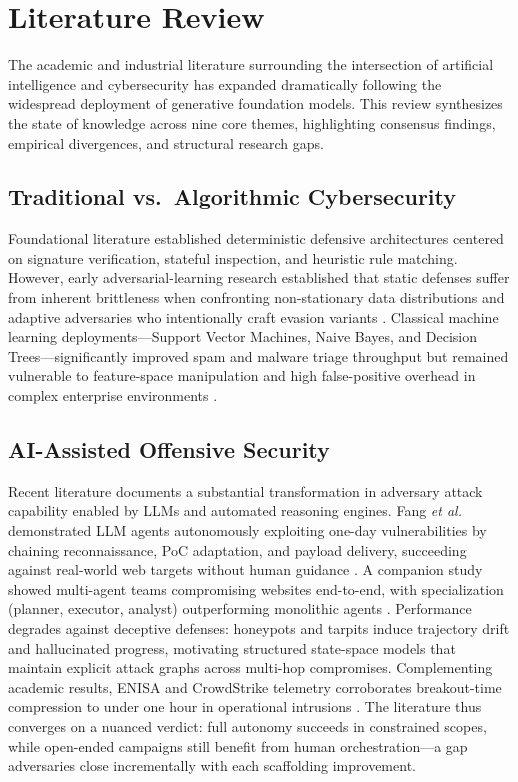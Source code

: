 \documentclass[conference,10pt,twocolumn,a4paper]{IEEEtran}
\begin{document}
\section{Literature Review}
\label{sec:literature}
The academic and industrial literature surrounding the intersection of artificial intelligence and cybersecurity has expanded dramatically following the widespread deployment of generative foundation models. This review synthesizes the state of knowledge across nine core themes, highlighting consensus findings, empirical divergences, and structural research gaps.

\subsection{Traditional vs.\ Algorithmic Cybersecurity}
Foundational literature established deterministic defensive architectures centered on signature verification, stateful inspection, and heuristic rule matching. However, early adversarial-learning research established that static defenses suffer from inherent brittleness when confronting non-stationary data distributions and adaptive adversaries who intentionally craft evasion variants \cite{mirsky2018kitsune, nist_sp_ai_100_2e2025}. Classical machine learning deployments---Support Vector Machines, Naive Bayes, and Decision Trees---significantly improved spam and malware triage throughput but remained vulnerable to feature-space manipulation and high false-positive overhead in complex enterprise environments \cite{mirsky2018kitsune}.

\subsection{AI-Assisted Offensive Security}
Recent literature documents a substantial transformation in adversary attack capability enabled by LLMs and automated reasoning engines. Fang \emph{et al.} demonstrated LLM agents autonomously exploiting one-day vulnerabilities by chaining reconnaissance, PoC adaptation, and payload delivery, succeeding against real-world web targets without human guidance \cite{fang2024llm}. A companion study showed multi-agent teams compromising websites end-to-end, with specialization (planner, executor, analyst) outperforming monolithic agents \cite{fang2024teams}. Performance degrades against deceptive defenses: honeypots and tarpits induce trajectory drift and hallucinated progress, motivating structured state-space models that maintain explicit attack graphs across multi-hop compromises. Complementing academic results, ENISA and CrowdStrike telemetry corroborates breakout-time compression to under one hour in operational intrusions \cite{enisa_etl_2025, crowdstrike_gtr_2025}. The literature thus converges on a nuanced verdict: full autonomy succeeds in constrained scopes, while open-ended campaigns still benefit from human orchestration---a gap adversaries close incrementally with each scaffolding improvement.
\end{document}
